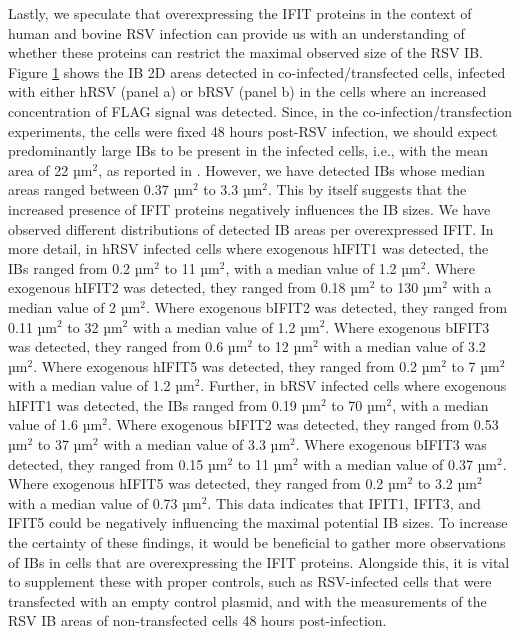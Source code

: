 \begin{figure}
    \label{fig:Distribution_IB_Areas_coInfected_Transfected_Cells_IFIT_RSV}
\end{figure}

Lastly, we speculate that overexpressing the IFIT proteins in the context of human and bovine RSV infection can provide us with an understanding of whether these proteins can restrict the maximal observed size of the RSV IB. Figure \ref{fig:Distribution_IB_Areas_coInfected_Transfected_Cells_IFIT_RSV} shows the IB 2D areas detected in co-infected/transfected cells, infected with either hRSV (panel a) or bRSV (panel b) in the cells where an increased concentration of FLAG signal was detected. Since, in the co-infection/transfection experiments, the cells were fixed 48 hours post-RSV infection, we should expect predominantly large IBs to be present in the infected cells, i.e., with the mean area of 22 \(\mbox{µm}^2\), as reported in \cite{Jobe2021BovineResponses}. However, we have detected IBs whose median areas ranged between 0.37 \(\mbox{µm}^2\) to 3.3 \(\mbox{µm}^2\). This by itself suggests that the increased presence of IFIT proteins negatively influences the IB sizes. We have observed different distributions of detected IB areas per overexpressed IFIT. In more detail, in hRSV infected cells where exogenous hIFIT1 was detected, the IBs ranged from 0.2 \(\mbox{µm}^2\) to 11 \(\mbox{µm}^2\), with a median value of 1.2 \(\mbox{µm}^2\). Where exogenous hIFIT2 was detected, they ranged from 0.18 \(\mbox{µm}^2\) to 130 \(\mbox{µm}^2\) with a median value of 2 \(\mbox{µm}^2\). Where exogenous bIFIT2 was detected, they ranged from 0.11 \(\mbox{µm}^2\) to 32 \(\mbox{µm}^2\) with a median value of 1.2 \(\mbox{µm}^2\). Where exogenous bIFIT3 was detected, they ranged from 0.6 \(\mbox{µm}^2\) to 12 \(\mbox{µm}^2\) with a median value of 3.2 \(\mbox{µm}^2\). Where exogenous hIFIT5 was detected, they ranged from 0.2 \(\mbox{µm}^2\) to 7 \(\mbox{µm}^2\) with a median value of 1.2 \(\mbox{µm}^2\). Further, in bRSV infected cells where exogenous hIFIT1 was detected, the IBs ranged from 0.19 \(\mbox{µm}^2\) to 70 \(\mbox{µm}^2\), with a median value of 1.6 \(\mbox{µm}^2\). Where exogenous bIFIT2 was detected, they ranged from 0.53 \(\mbox{µm}^2\) to 37 \(\mbox{µm}^2\) with a median value of 3.3 \(\mbox{µm}^2\). Where exogenous bIFIT3 was detected, they ranged from 0.15 \(\mbox{µm}^2\) to 11 \(\mbox{µm}^2\) with a median value of 0.37 \(\mbox{µm}^2\). Where exogenous hIFIT5 was detected, they ranged from 0.2 \(\mbox{µm}^2\) to 3.2 \(\mbox{µm}^2\) with a median value of 0.73 \(\mbox{µm}^2\). This data indicates that IFIT1, IFIT3, and IFIT5 could be negatively influencing the maximal potential IB sizes. To increase the certainty of these findings, it would be beneficial to gather more observations of IBs in cells that are overexpressing the IFIT proteins. Alongside this, it is vital to supplement these with proper controls, such as RSV-infected cells that were transfected with an empty control plasmid, and with the measurements of the RSV IB areas of non-transfected cells 48 hours post-infection.

